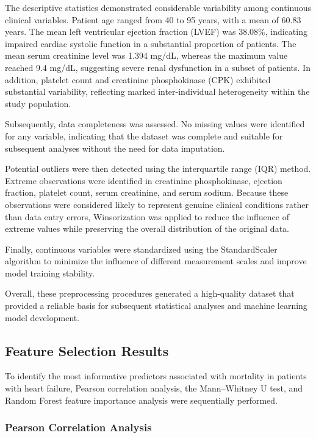 \documentclass[12pt]{article}
\begin{document}
The descriptive statistics demonstrated considerable variability among continuous clinical variables. Patient age ranged from 40 to 95 years, with a mean of 60.83 years. The mean left ventricular ejection fraction (LVEF) was 38.08\%, indicating impaired cardiac systolic function in a substantial proportion of patients. The mean serum creatinine level was 1.394 mg/dL, whereas the maximum value reached 9.4 mg/dL, suggesting severe renal dysfunction in a subset of patients. In addition, platelet count and creatinine phosphokinase (CPK) exhibited substantial variability, reflecting marked inter-individual heterogeneity within the study population.

Subsequently, data completeness was assessed. No missing values were identified for any variable, indicating that the dataset was complete and suitable for subsequent analyses without the need for data imputation.

Potential outliers were then detected using the interquartile range (IQR) method. Extreme observations were identified in creatinine phosphokinase, ejection fraction, platelet count, serum creatinine, and serum sodium. Because these observations were considered likely to represent genuine clinical conditions rather than data entry errors, Winsorization was applied to reduce the influence of extreme values while preserving the overall distribution of the original data.

Finally, continuous variables were standardized using the StandardScaler algorithm to minimize the influence of different measurement scales and improve model training stability.

Overall, these preprocessing procedures generated a high-quality dataset that provided a reliable basis for subsequent statistical analyses and machine learning model development. 

\subsection{Feature Selection Results}

To identify the most informative predictors associated with mortality in patients with heart failure, Pearson correlation analysis, the Mann–Whitney U test, and Random Forest feature importance analysis were sequentially performed.

\subsubsection{Pearson Correlation Analysis}
\end{document}
